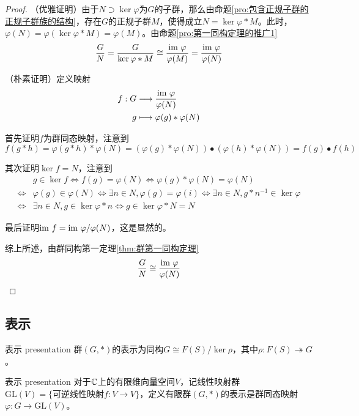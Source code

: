\begin{proof}
	（优雅证明）由于$N\supset\ker\varphi$为$G$的子群，那么由命题\ref{pro:包含正规子群的正规子群族的结构}，存在$G$的正规子群$M$，使得成立$N=\ker\varphi*M$。此时，$\varphi(N)=\varphi(\ker\varphi*M)=\varphi(M)$。由命题\ref{pro:第一同构定理的推广1}
	$$
	\frac{G}{N}=\frac{G}{\ker\varphi*M}\cong\frac{\text{im } \varphi}{\varphi(M)}=\frac{\text{im } \varphi}{\varphi(N)}
	$$
	
	（朴素证明）定义映射
	\begin{align*}
		f:\begin{aligned}[t]
			G&\longrightarrow \frac{\text{im } \varphi}{\varphi(N)}\\
			g&\longmapsto \varphi(g)*\varphi(N)
		\end{aligned}
	\end{align*}
	
	首先证明$f$为群同态映射，注意到
	$$
	f(g*h)=\varphi(g*h)*\varphi(N)=(\varphi(g)*\varphi(N))\bullet (\varphi(h)*\varphi(N))=f(g)\bullet f(h)
	$$
	
	其次证明$\ker f=N$，注意到
	\begin{align*}
		&g\in\ker f
		\iff f(g)=\varphi(N)
		\iff \varphi(g)*\varphi(N)=\varphi(N)\\
		\iff &\varphi(g)\in\varphi(N)
		\iff \exists n\in N,\varphi(g)=\varphi(i)
		\iff \exists n\in N,g*n^{-1}\in\ker\varphi\\
		\iff&\exists n\in N,g\in\ker\varphi*n
		\iff g\in\ker\varphi*N=N
	\end{align*}
	
	最后证明$\text{im } f=\text{im } \varphi/\varphi(N)$，这是显然的。
	
	综上所述，由群同构第一定理\ref{thm:群第一同构定理}
	$$
	\frac{G}{N}\cong\frac{\text{im } \varphi}{\varphi(N)}
	$$
\end{proof}

\subsection{表示}

\begin{definition}{表示 presentation}
	群$(G,*)$的表示为同构$G\cong F(S)/\ker \rho$，其中$\rho:F(S)\twoheadrightarrow G$。
\end{definition}

\begin{definition}{表示 presentation}
	对于$\mathbb{C}$上的有限维向量空间$V$，记线性映射群$\mathrm{GL}(V)=\{ \text{可逆线性映射}f:V\to V  \}$，定义有限群$(G,*)$的表示是群同态映射$\varphi:G\to\mathrm{GL}(V)$。
\end{definition}

